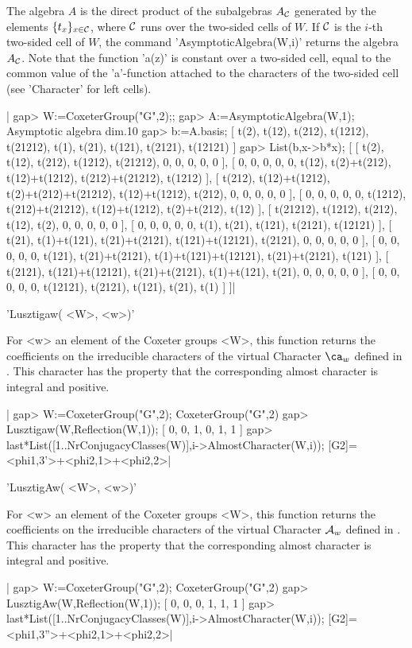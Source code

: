 The  algebra $A$ is the direct product of the subalgebras $A_{\mathcal C}$ generated
by  the elements $\{t_x\}_{x\in{\mathcal C}}$,  where ${\mathcal C}$ runs  over the two-sided
cells  of $W$. If  ${\mathcal C}$ is the  $i$-th two-sided cell  of $W$, the command
'AsymptoticAlgebra(W,i)'   returns  the  algebra  $A_{\mathcal C}$.  Note  that  the
function  'a(z)' is  constant over  a two-sided  cell, equal  to the common
value  of the 'a'-function attached to the characters of the two-sided cell
(see 'Character' for left cells).

|    gap> W:=CoxeterGroup("G",2);;
    gap> A:=AsymptoticAlgebra(W,1);
    Asymptotic algebra dim.10
    gap> b:=A.basis;
    [ t(2), t(12), t(212), t(1212), t(21212), t(1), t(21), t(121),
      t(2121), t(12121) ]
    gap> List(b,x->b*x);
    [ [ t(2), t(12), t(212), t(1212), t(21212), 0, 0, 0, 0, 0 ],
      [ 0, 0, 0, 0, 0, t(12), t(2)+t(212), t(12)+t(1212), t(212)+t(21212),
          t(1212) ],
      [ t(212), t(12)+t(1212), t(2)+t(212)+t(21212), t(12)+t(1212),
          t(212), 0, 0, 0, 0, 0 ],
      [ 0, 0, 0, 0, 0, t(1212), t(212)+t(21212), t(12)+t(1212),
          t(2)+t(212), t(12) ],
      [ t(21212), t(1212), t(212), t(12), t(2), 0, 0, 0, 0, 0 ],
      [ 0, 0, 0, 0, 0, t(1), t(21), t(121), t(2121), t(12121) ],
      [ t(21), t(1)+t(121), t(21)+t(2121), t(121)+t(12121), t(2121), 0,
          0, 0, 0, 0 ],
      [ 0, 0, 0, 0, 0, t(121), t(21)+t(2121), t(1)+t(121)+t(12121),
          t(21)+t(2121), t(121) ],
      [ t(2121), t(121)+t(12121), t(21)+t(2121), t(1)+t(121), t(21), 0,
          0, 0, 0, 0 ],
      [ 0, 0, 0, 0, 0, t(12121), t(2121), t(121), t(21), t(1) ] ]|


'Lusztigaw( <W>, <w>)'

For  <w> an element  of the Coxeter  groups <W>, this  function returns the
coefficients on the irreducible characters of the virtual Character $\ca_w$
defined  in \cite[5.10.2]{Lus85}. This character  has the property that the
corresponding almost character is integral and positive.

|    gap> W:=CoxeterGroup("G",2);
    CoxeterGroup("G",2)
    gap> Lusztigaw(W,Reflection(W,1));
    [ 0, 0, 1, 0, 1, 1 ]
    gap> last*List([1..NrConjugacyClasses(W)],i->AlmostCharacter(W,i));
    [G2]=<phi{1,3}'>+<phi{2,1}>+<phi{2,2}>|


'LusztigAw( <W>, <w>)'

For  <w> an element  of the Coxeter  groups <W>, this  function returns the
coefficients on the irreducible characters of the virtual Character ${\mathcal A}_w$
defined  in \cite[5.10.2]{Lus85}. This character  has the property that the
corresponding almost character is integral and positive.

|    gap> W:=CoxeterGroup("G",2);
    CoxeterGroup("G",2)
    gap> LusztigAw(W,Reflection(W,1));
    [ 0, 0, 0, 1, 1, 1 ]
    gap> last*List([1..NrConjugacyClasses(W)],i->AlmostCharacter(W,i));
    [G2]=<phi{1,3}''>+<phi{2,1}>+<phi{2,2}>|
